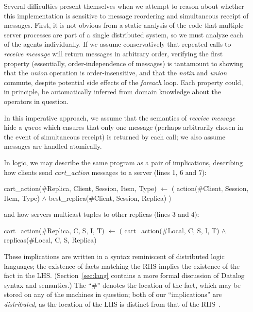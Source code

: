 Several difficulties present themselves when we attempt to reason about whether
this implementation is sensitive to message reordering and simultaneous receipt of messages.
First, it is not obvious from a static analysis of the code that multiple server processes are
part of a single distributed system, so we must analyze each of the agents individually.
If we assume conservatively that repeated calls to {\em receive message} will return messages in
arbitrary order, verifying the first property (essentially, order-independence of messages)
is tantamount to showing that the {\em union} operation is
order-insensitive, and that the {\em notin} and {\em union} commute, despite potential
side effects of the {\em foreach} loop.  Each property could, in principle, be automatically inferred
from domain knowledge about the operators in question.

In this imperative approach, we assume that the semantics of {\em receive message}
hide a {\em queue} which ensures that only one message (perhaps arbitrarily chosen in the
event of simultaneous receipt) is returned by each call; we also assume messages are handled atomically.


In logic, we may describe the same program
as a pair of implications, describing how clients send {\em cart\_action}
messages to a server (lines 1, 6 and 7):

\begin{Dedalus}
cart\_action(#Replica, Client, Session, Item, Type)
  \(\leftarrow\) ( action(#Client, Session, Item, Type) \(\land\)
       best_replica(#Client, Session, Replica) )
\end{Dedalus}

\noindent and how servers multicast tuples to other replicas (lines 3 and 4):

\begin{Dedalus}
cart\_action(#Replica, C, S, I, T)
  \(\leftarrow\) ( cart\_action(#Local, C, S, I, T) \(\land\)
       replicas(#Local, C, S, Replica)
\end{Dedalus}

These implications are written in a syntax reminiscent of distributed
logic languages; the existence of facts matching the RHS implies the
existence of the fact in the LHS.  (Section~\ref{sec:lang}
contains a more formal discussion of Datalog syntax and semantics.)
The ``\#'' denotes the location of the fact, which may be stored on
any of the machines in question; both of our ``implications'' are {\em
  distributed}, as the location of the LHS is distinct from that of the
RHS~\cite{Loo2009-CACM}.  

